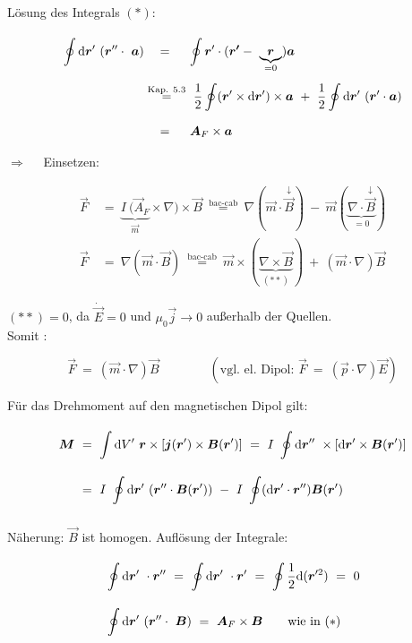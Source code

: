 Lösung des Integrals $(*)$:

\begin{align*}
\Oint{}{}{\vec{r}'} (\vec{r}''\cdot \ \vec{a}) & \quad = \quad \ \oint{}{}{\vec{r}'} \cdot (\vec{r'}- \ \underbrace{\vec{r}}_{=0}) \vec{a}\\
& \overset{\text{Kap. 5.3}}{=} \ \frac{1}{2}\oint(\vec{r}'\times\d\vec{r}')\times\vec{a} \ + \ \frac{1}{2}\Oint{}{}{\vec{r}'}(\vec{r}'\cdot\vec{a})\\
& \quad = \quad \ \vec{A}_F \times\vec{a}
\end{align*}

$\Rightarrow\quad$ Einsetzen:

\begin{align*}
\vec{F}  \ &= \ \underbrace{I \ (\vec{A}_F}_{\vec{m}} \times \nabla)\times \vec{B} \ \overset{\text{bac-cab}}{=} \ \nabla(\vec{m}\cdot\overset{\downarrow}{\vec{B}}) \ - \ \vec{m}(\underbrace{\nabla\cdot\overset{\downarrow}{\vec{B}}}_{=0})\\
\vec{F}  \ &= \ \nabla(\vec{m}\cdot\vec{B}) \ \overset{\text{bac-cab}}{=} \ \vec{m} \times (\underbrace{\nabla\times\vec{B}}_{(**)}) \ + \ (\vec{m}\cdot\nabla)\vec{B}
\end{align*}

$(**)=0$, da $\dot{\vec{E}}=0$ und $\mu_0\vec{j}\rightarrow 0$ außerhalb der Quellen.\\
Somit :

\begin{equation*}
\vec{F}  \ = \  (\vec{m}\cdot\nabla) \vec{B} \qquad\qquad (\text{vgl. el. Dipol: } \vec{F}  \ = \ (\vec{p}\cdot\nabla)\vec{E})
\end{equation*}

Für das Drehmoment auf den magnetischen Dipol gilt:

\begin{align*}
\vec{M}  \ &= \ \Int{}{}{V'} \vec{r}\times\left[\vec{j}(\vec{r}') \times \vec{B}(\vec{r}')\right] \ = \  I  \ \Oint{}{}{\vec{r}''} \times \left[\d\vec{r}' \times\vec{B}(\vec{r}')\right]\\
&= \ I \ \Oint{}{}{\vec{r}'}(\vec{r}''\cdot\vec{B}(\vec{r}')) \ - \ I \ \oint(\d\vec{r}'\cdot\vec{r}'')\vec{B}(\vec{r}')
\end{align*}

Näherung: $\vec{B}$ ist homogen. Auflösung der Integrale:

\begin{align*}
&\Oint{}{}{\vec{r}'} \cdot \vec{r}'' \ = \ \Oint{}{}{\vec{r}'}\cdot\vec{r}'  \ = \ \oint\frac{1}{2}\d(\vec{r}'^2)  \ = \ 0\\
&\Oint{}{}{\vec{r}'} (\vec{r}''\cdot\ \vec{B})  \ = \ \vec{A}_F \times\vec{B} \qquad \text{wie in } (*)
\end{align*}

